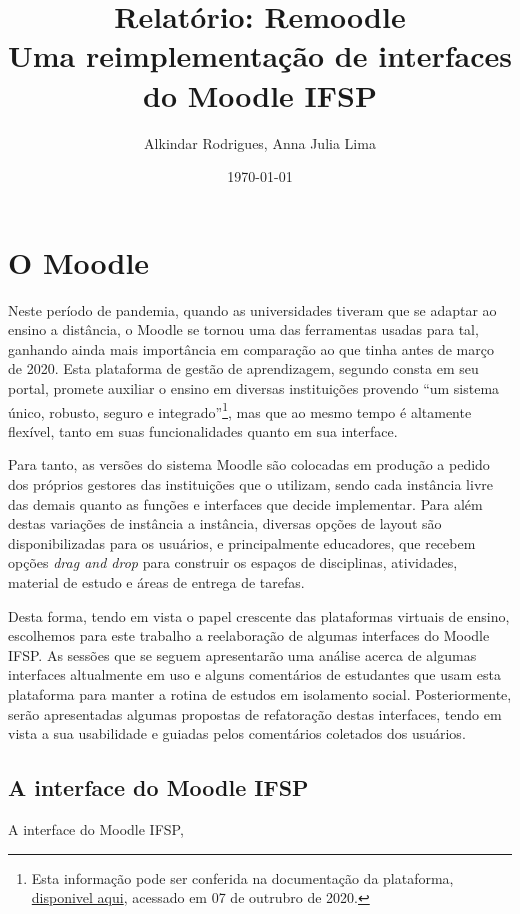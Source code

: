 \documentclass[11pt]{article}
\author{Alkindar Rodrigues, Anna Julia Lima}
\date{\today}
\title{Relatório: Remoodle\\\medskip
\large Uma reimplementação de interfaces do Moodle IFSP}
\begin{document}
\maketitle

\section*{O Moodle}
\label{sec:org2bf61aa}
Neste período de pandemia, quando as universidades tiveram que se
adaptar ao ensino a distância, o Moodle se tornou uma das ferramentas
usadas para tal, ganhando ainda mais importância em comparação ao que
tinha antes de março de 2020.
Esta plataforma de gestão de aprendizagem, segundo consta em seu
portal, promete auxiliar o ensino em diversas instituições provendo
``um sistema único, robusto, seguro e integrado''\footnote{Esta informação pode ser conferida na documentação da
plataforma, \href{https://docs.moodle.org/39/en/About\_Moodle\#Highly\_flexible\_and\_fully\_customisable}{disponivel aqui}, acessado em 07 de outrubro de 2020.}, mas que ao mesmo
tempo é altamente flexível, tanto em suas funcionalidades quanto em
sua interface.

Para tanto, as versões do sistema Moodle são colocadas em produção
a pedido dos próprios gestores das instituições que o utilizam, sendo
cada instância livre das demais quanto as funções e interfaces
que decide implementar.
Para além destas variações de instância a instância, diversas opções
de layout são disponibilizadas para os usuários, e principalmente
educadores, que recebem opções \emph{drag and drop} para construir os
espaços de disciplinas, atividades, material de estudo e áreas de
entrega de tarefas.

Desta forma, tendo em vista o papel crescente das plataformas virtuais
de ensino, escolhemos para este trabalho a reelaboração de algumas
interfaces do Moodle IFSP.
As sessões que se seguem apresentarão uma análise acerca de algumas
interfaces altualmente em uso e alguns comentários de estudantes que
usam esta plataforma para manter a rotina de estudos em isolamento
social.
Posteriormente, serão apresentadas algumas propostas de refatoração
destas interfaces, tendo em vista a sua usabilidade e guiadas pelos
comentários coletados dos usuários.

\subsection*{A interface do Moodle IFSP}
\label{sec:org13792b4}
A interface do Moodle IFSP,
\end{document}
